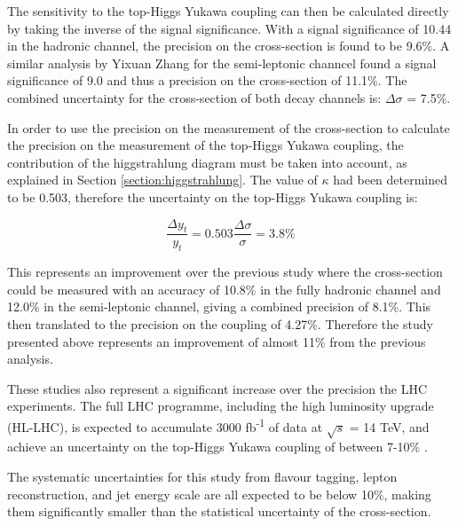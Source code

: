 The sensitivity to the top-Higgs Yukawa coupling can then be calculated directly by taking the inverse of the signal significance. With a signal significance of 10.44 in the hadronic channel, the precision on the cross-section is found to be 9.6\%. A similar analysis by Yixuan Zhang for the semi-leptonic channcel found a signal significance of 9.0 and thus a precision on the cross-section of 11.1\%. The combined uncertainty for the cross-section of both decay channels is: $\Delta\sigma$ = 7.5\%.

In order to use the precision on the measurement of the cross-section to calculate the precision on the measurement of the top-Higgs Yukawa coupling, the contribution of the higgstrahlung diagram must be taken into account, as explained in Section \ref{section:higgstrahlung}. The value of $\kappa$ had been determined to be 0.503, therefore the uncertainty on the top-Higgs Yukawa coupling is:

\begin{equation}
	\frac{\Delta y_t}{y_t} = 0.503 \frac{\Delta\sigma}{\sigma} = 3.8\%
\label{eq:result-coupling}
\end{equation}

This represents an improvement over the previous study  where the cross-section could be measured with an accuracy of 10.8\% in the fully hadronic channel and 12.0\% in the semi-leptonic channel, giving a combined precision of 8.1\%. This then translated to the precision on the coupling of 4.27\%. Therefore the study presented above represents an improvement of almost 11\% from the previous analysis.

These studies also represent a significant increase over the precision the \acrshort{LHC} experiments. The full \acrshort{LHC} programme, including the high luminosity upgrade (\acrshort{HL-LHC}), is expected to accumulate 3000 fb\textsuperscript{-1} of data at $\sqrt{s}$ = 14 TeV, and achieve an uncertainty on the top-Higgs Yukawa coupling of between 7-10\% \cite{lhc-top-yukawa}.

The systematic uncertainties for this study from flavour tagging, lepton reconstruction, and jet energy scale are all expected to be below 10\%, making them significantly smaller than the statistical uncertainty of the cross-section. %


